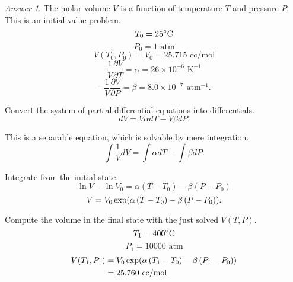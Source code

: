 \documentclass[a4paper, 12pt]{article}
\newcommand{\Left}{\mathopen{}\mathclose\bgroup\left}
\newcommand{\Right}{\aftergroup\egroup\right}
\theoremstyle{definition}
\theoremstyle{remark}
\newtheorem*{answer}{Answer}
\begin{document}
\begin{answer}
    The molar volume $V$ is a function of temperature $T$ and pressure $P$.
    This is an initial value problem.
    \[ T_0 = 25^\circ\text C \]
    \[ P_0 = 1\text{ atm} \]
    \[ V(T_0, P_0) = V_0 = 25.715\text{ cc/mol} \]
    \[ \frac1V \frac{\partial V}{\partial T} = \alpha = 26 \times 10^{-6}\text{ K}^{-1} \]
    \[ -\frac1V \frac{\partial V}{\partial P} = \beta = 8.0 \times 10^{-7}\text{ atm}^{-1}.\]

    Convert the system of partial differential equations into differentials.
    \[ dV = V \alpha dT - V \beta dP.\]

    This is a separable equation, which is solvable by mere integration.
    \[ \int \frac1V dV = \int \alpha dT - \int \beta dP.\]

    Integrate from the initial state.
    \[ \ln V - \ln V_0 = \alpha \left( T - T_0 \right) - \beta \left( P - P_0 \right) \]
    \[ V = V_0 \exp \Left( \alpha \left( T - T_0 \right) - \beta \left( P - P_0 \right) \Right).\]

    Compute the volume in the final state with the just solved $V(T, P)$.
    \[ T_1 = 400^\circ\text C \]
    \[ P_1 = 10000\text{ atm} \]
    \begin{align*}
        V(T_1, P_1)
        &= V_0 \exp \Left( \alpha \left( T_1 - T_0 \right) - \beta \left( P_1 - P_0 \right) \Right) \\
        &= 25.760 \text{ cc/mol}
    \end{align*}
\end{answer}
\end{document}
